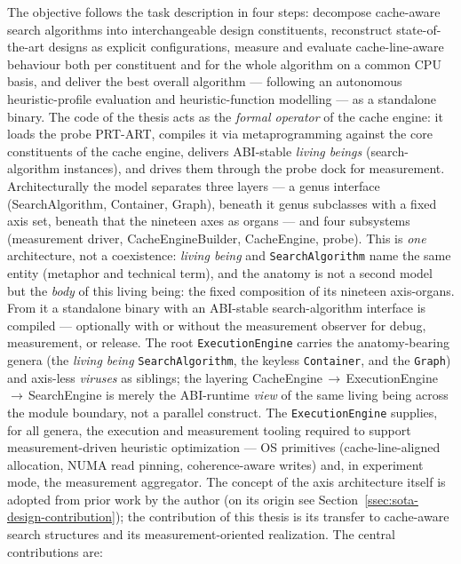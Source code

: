 The objective follows the task description in four steps: decompose cache-aware search algorithms
into interchangeable design constituents, reconstruct state-of-the-art designs as explicit
configurations, measure and evaluate cache-line-aware behaviour both per constituent and for the
whole algorithm on a common CPU basis, and deliver the best overall algorithm --- following an
autonomous heuristic-profile evaluation and heuristic-function modelling --- as a standalone binary.
The code of the thesis acts as the \emph{formal operator} of the cache engine: it loads the probe
PRT-ART, compiles it via metaprogramming against the core constituents of the cache engine, delivers
ABI-stable \emph{living beings} (search-algorithm instances), and drives them through the probe dock
for measurement. Architecturally the model separates three layers --- a genus interface
(SearchAlgorithm, Container, Graph), beneath it genus subclasses with a fixed axis set,
beneath that the nineteen axes as organs --- and four subsystems (measurement driver,
CacheEngineBuilder, CacheEngine, probe). This is \emph{one} architecture, not a coexistence:
\emph{living being} and \texttt{SearchAlgorithm} name the same entity (metaphor and technical term),
and the anatomy is not a second model but the \emph{body} of this living being: the fixed
composition of its nineteen axis-organs. From it a standalone binary with an ABI-stable
search-algorithm interface is compiled --- optionally with or without the measurement observer for
debug, measurement, or release. The root \texttt{ExecutionEngine} carries the anatomy-bearing genera (the \emph{living being} \texttt{SearchAlgorithm}, the keyless \texttt{Container}, and the \texttt{Graph}) and
axis-less \emph{viruses} as siblings; the layering
CacheEngine\,$\to$\,ExecutionEngine\,$\to$\,SearchEngine is merely the ABI-runtime \emph{view} of
the same living being across the module boundary, not a parallel construct. The
\texttt{ExecutionEngine} supplies, for all genera, the execution and measurement tooling required to
support measurement-driven heuristic optimization --- OS primitives (cache-line-aligned allocation,
NUMA read pinning, coherence-aware writes) and, in experiment mode, the measurement aggregator. The
concept of the axis architecture itself is adopted from prior work by the author (on its origin see
Section~\ref{ssec:sota-design-contribution}); the contribution of this thesis is its transfer to
cache-aware search structures and its measurement-oriented realization. The central contributions
are:
